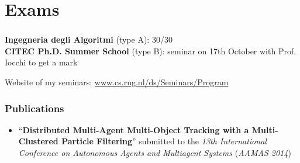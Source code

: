 \section{Exams}

\begin{frame}
	\frametitle{}
	
	\begin{center}
	\end{center}
	
	\vspace{-0.1cm}
	
	\tiny
	\textbf{Ingegneria degli Algoritmi} (type A): 30/30 \\
	
	\vspace{0.1cm}
	\textbf{CITEC Ph.D. Summer School} (type B): seminar on 17th October with Prof. Iocchi to get a mark\\
	
	\vspace{-0.15cm}
	
	Website of my seminars: \url{www.cs.rug.nl/ds/Seminars/Program}
\end{frame}

\begin{frame}
	\frametitle{Publications}
	
	\begin{itemize}
		\item ``\textbf{Distributed Multi-Agent Multi-Object Tracking with a Multi-Clustered Particle Filtering}''
			  submitted to the \emph{13th International Conference on Autonomous Agents and Multiagent Systems}
			  (\emph{AAMAS 2014})
	\end{itemize}
\end{frame}

